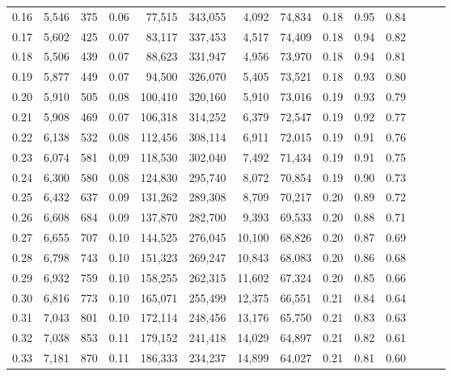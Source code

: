 \begin{tabular}{rrrrrrrrrrrrrr}
0.16 &   5,546 &    375 &  0.06 &   77,515 &  343,055 &   4,092 &  74,834 &  0.18 &  0.95 &      0.84 \\
0.17 &   5,602 &    425 &  0.07 &   83,117 &  337,453 &   4,517 &  74,409 &  0.18 &  0.94 &      0.82 \\
0.18 &   5,506 &    439 &  0.07 &   88,623 &  331,947 &   4,956 &  73,970 &  0.18 &  0.94 &      0.81 \\
0.19 &   5,877 &    449 &  0.07 &   94,500 &  326,070 &   5,405 &  73,521 &  0.18 &  0.93 &      0.80 \\
0.20 &   5,910 &    505 &  0.08 &  100,410 &  320,160 &   5,910 &  73,016 &  0.19 &  0.93 &      0.79 \\
0.21 &   5,908 &    469 &  0.07 &  106,318 &  314,252 &   6,379 &  72,547 &  0.19 &  0.92 &      0.77 \\
0.22 &   6,138 &    532 &  0.08 &  112,456 &  308,114 &   6,911 &  72,015 &  0.19 &  0.91 &      0.76 \\
0.23 &   6,074 &    581 &  0.09 &  118,530 &  302,040 &   7,492 &  71,434 &  0.19 &  0.91 &      0.75 \\
0.24 &   6,300 &    580 &  0.08 &  124,830 &  295,740 &   8,072 &  70,854 &  0.19 &  0.90 &      0.73 \\
0.25 &   6,432 &    637 &  0.09 &  131,262 &  289,308 &   8,709 &  70,217 &  0.20 &  0.89 &      0.72 \\
0.26 &   6,608 &    684 &  0.09 &  137,870 &  282,700 &   9,393 &  69,533 &  0.20 &  0.88 &      0.71 \\
0.27 &   6,655 &    707 &  0.10 &  144,525 &  276,045 &  10,100 &  68,826 &  0.20 &  0.87 &      0.69 \\
0.28 &   6,798 &    743 &  0.10 &  151,323 &  269,247 &  10,843 &  68,083 &  0.20 &  0.86 &      0.68 \\
0.29 &   6,932 &    759 &  0.10 &  158,255 &  262,315 &  11,602 &  67,324 &  0.20 &  0.85 &      0.66 \\
0.30 &   6,816 &    773 &  0.10 &  165,071 &  255,499 &  12,375 &  66,551 &  0.21 &  0.84 &      0.64 \\
0.31 &   7,043 &    801 &  0.10 &  172,114 &  248,456 &  13,176 &  65,750 &  0.21 &  0.83 &      0.63 \\
0.32 &   7,038 &    853 &  0.11 &  179,152 &  241,418 &  14,029 &  64,897 &  0.21 &  0.82 &      0.61 \\
0.33 &   7,181 &    870 &  0.11 &  186,333 &  234,237 &  14,899 &  64,027 &  0.21 &  0.81 &      0.60 \\

\end{tabular}
